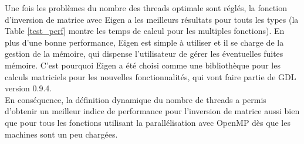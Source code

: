 Une fois les problèmes du nombre des threads optimale sont réglés, la fonction d'inversion de matrice avec Eigen a les meilleurs résultats pour touts les types (la Table \ref{test_perf} montre les temps de calcul pour les multiples fonctions). En plus d'une bonne performance, Eigen est simple à utiliser et il se charge de la gestion de la mémoire, qui dispense l'utilisateur de gérer les éventuelles fuites mémoire. C'est pourquoi Eigen a été choisi comme une bibliothèque pour les calculs matriciels pour les nouvelles fonctionnalités, qui vont faire partie de GDL version 0.9.4.\\

En conséquence, la définition dynamique du nombre de threads a permis d'obtenir un meilleur indice de performance pour l'inversion de matrice aussi bien que pour tous les fonctions utilisant la parallélisation avec OpenMP dès que les machines sont un peu chargées.

